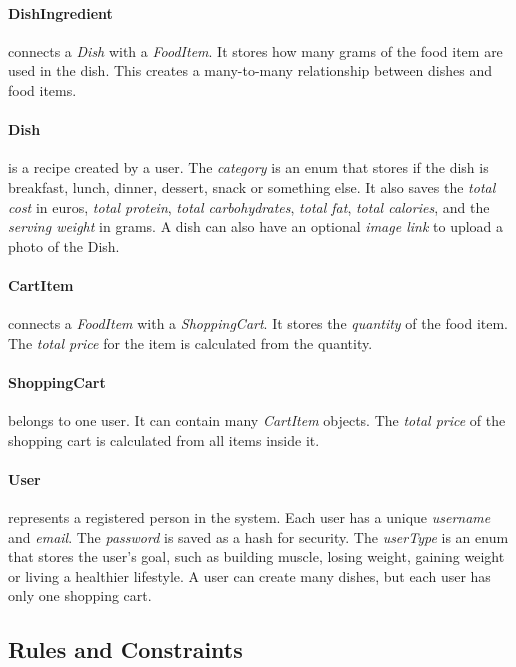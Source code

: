 \documentclass[11pt]{article}
\begin{document}
\paragraph{DishIngredient} connects a \textit{Dish} with a \textit{FoodItem}.
It stores how many grams of the food item are used in the dish.
This creates a many-to-many relationship between dishes and food items.

\paragraph{Dish} is a recipe created by a user. 
The \textit{category} is an enum that stores if the dish is breakfast, lunch, dinner, dessert, snack or something else.
It also saves the 
\textit{total cost} in euros, 
\textit{total protein}, 
\textit{total carbohydrates}, 
\textit{total fat}, 
\textit{total calories}, 
and the \textit{serving weight} in grams.
A dish can also have an optional \textit{image link} to upload a photo of the Dish.

\paragraph{CartItem} connects a \textit{FoodItem} with a \textit{ShoppingCart}.
It stores the \textit{quantity} of the food item.
The \textit{total price} for the item is calculated from the quantity.

\paragraph{ShoppingCart} belongs to one user.
It can contain many \textit{CartItem} objects.
The \textit{total price} of the shopping cart is calculated from all items inside it.

\paragraph{User} represents a registered person in the system. 
Each user has a unique \textit{username} and \textit{email}. 
The \textit{password} is saved as a hash for security.
The \textit{userType} is an enum that stores the user's goal, such as building muscle, losing weight, gaining weight or living a healthier lifestyle.
A user can create many dishes, but each user has only one shopping cart.


\subsection*{Rules and Constraints}
\end{document}
